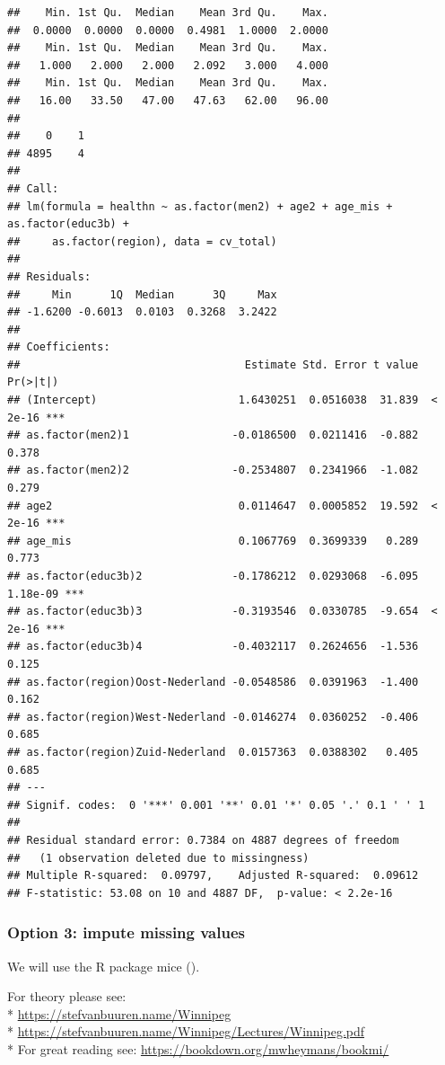 \documentclass[
]{book}
\begin{document}
\begin{verbatim}
##    Min. 1st Qu.  Median    Mean 3rd Qu.    Max. 
##  0.0000  0.0000  0.0000  0.4981  1.0000  2.0000 
##    Min. 1st Qu.  Median    Mean 3rd Qu.    Max. 
##   1.000   2.000   2.000   2.092   3.000   4.000 
##    Min. 1st Qu.  Median    Mean 3rd Qu.    Max. 
##   16.00   33.50   47.00   47.63   62.00   96.00 
## 
##    0    1 
## 4895    4 
## 
## Call:
## lm(formula = healthn ~ as.factor(men2) + age2 + age_mis + as.factor(educ3b) + 
##     as.factor(region), data = cv_total)
## 
## Residuals:
##     Min      1Q  Median      3Q     Max 
## -1.6200 -0.6013  0.0103  0.3268  3.2422 
## 
## Coefficients:
##                                   Estimate Std. Error t value Pr(>|t|)    
## (Intercept)                      1.6430251  0.0516038  31.839  < 2e-16 ***
## as.factor(men2)1                -0.0186500  0.0211416  -0.882    0.378    
## as.factor(men2)2                -0.2534807  0.2341966  -1.082    0.279    
## age2                             0.0114647  0.0005852  19.592  < 2e-16 ***
## age_mis                          0.1067769  0.3699339   0.289    0.773    
## as.factor(educ3b)2              -0.1786212  0.0293068  -6.095 1.18e-09 ***
## as.factor(educ3b)3              -0.3193546  0.0330785  -9.654  < 2e-16 ***
## as.factor(educ3b)4              -0.4032117  0.2624656  -1.536    0.125    
## as.factor(region)Oost-Nederland -0.0548586  0.0391963  -1.400    0.162    
## as.factor(region)West-Nederland -0.0146274  0.0360252  -0.406    0.685    
## as.factor(region)Zuid-Nederland  0.0157363  0.0388302   0.405    0.685    
## ---
## Signif. codes:  0 '***' 0.001 '**' 0.01 '*' 0.05 '.' 0.1 ' ' 1
## 
## Residual standard error: 0.7384 on 4887 degrees of freedom
##   (1 observation deleted due to missingness)
## Multiple R-squared:  0.09797,    Adjusted R-squared:  0.09612 
## F-statistic: 53.08 on 10 and 4887 DF,  p-value: < 2.2e-16
\end{verbatim}

\hypertarget{option-3-impute-missing-values}{%
\subsubsection{Option 3: impute missing values}\label{option-3-impute-missing-values}}

We will use the R package mice (\citet{mice}).

For theory please see:\\
* \url{https://stefvanbuuren.name/Winnipeg}\\
* \url{https://stefvanbuuren.name/Winnipeg/Lectures/Winnipeg.pdf}\\
* For great reading see: \url{https://bookdown.org/mwheymans/bookmi/}
\end{document}
